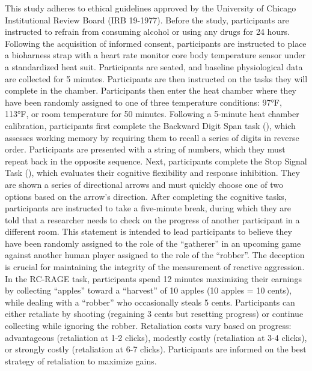 \documentclass[
  man,
  floatsintext,
  longtable,
  nolmodern,
  notxfonts,
  notimes,
  colorlinks=true,linkcolor=blue,citecolor=blue,urlcolor=blue]{apa7}
\begin{document}
This study adheres to ethical guidelines approved by the University of
Chicago Institutional Review Board (IRB 19-1977). Before the study,
participants are instructed to refrain from consuming alcohol or using
any drugs for 24 hours. Following the acquisition of informed consent,
participants are instructed to place a bioharness strap with a heart
rate monitor core body temperature sensor under a standardized heat
suit. Participants are seated, and baseline physiological data are
collected for 5 minutes. Participants are then instructed on the tasks
they will complete in the chamber. Participants then enter the heat
chamber where they have been randomly assigned to one of three
temperature conditions: 97°F, 113°F, or room temperature for 50 minutes.
Following a 5-minute heat chamber calibration, participants first
complete the Backward Digit Span task
(), which
assesses working memory by requiring them to recall a series of digits
in reverse order. Participants are presented with a string of numbers,
which they must repeat back in the opposite sequence. Next, participants
complete the Stop Signal Task
(),
which evaluates their cognitive flexibility and response inhibition.
They are shown a series of directional arrows and must quickly choose
one of two options based on the arrow's direction. After completing the
cognitive tasks, participants are instructed to take a five-minute
break, during which they are told that a researcher needs to check on
the progress of another participant in a different room. This statement
is intended to lead participants to believe they have been randomly
assigned to the role of the ``gatherer'' in an upcoming game against
another human player assigned to the role of the ``robber''. The
deception is crucial for maintaining the integrity of the measurement of
reactive aggression. In the RC-RAGE task, participants spend 12 minutes
maximizing their earnings by collecting ``apples'' toward a ``harvest''
of 10 apples (10 apples = 10 cents), while dealing with a ``robber'' who
occasionally steals 5 cents. Participants can either retaliate by
shooting (regaining 3 cents but resetting progress) or continue
collecting while ignoring the robber. Retaliation costs vary based on
progress: advantageous (retaliation at 1-2 clicks), modestly costly
(retaliation at 3-4 clicks), or strongly costly (retaliation at 6-7
clicks). Participants are informed on the best strategy of retaliation
to maximize gains.
\end{document}
